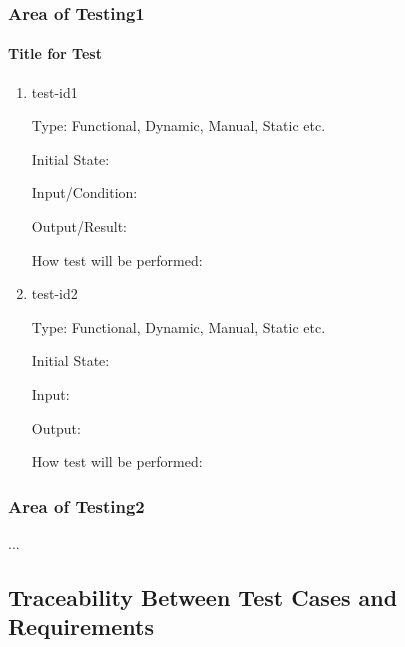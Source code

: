 \documentclass[12pt, titlepage]{article}
\begin{document}
	
	
	\subsubsection{Area of Testing1}
	
	\paragraph{Title for Test}
	
	\begin{enumerate}
		
		\item{test-id1\\}
		
		Type: Functional, Dynamic, Manual, Static etc.
		
		Initial State: 
		
		Input/Condition: 
		
		Output/Result: 
		
		How test will be performed: 
		
		\item{test-id2\\}
		
		Type: Functional, Dynamic, Manual, Static etc.
		
		Initial State: 
		
		Input: 
		
		Output: 
		
		How test will be performed: 
		
	\end{enumerate}
	
	\subsubsection{Area of Testing2}
	
	...
	
	\subsection{Traceability Between Test Cases and Requirements}
	
	
\end{document}
